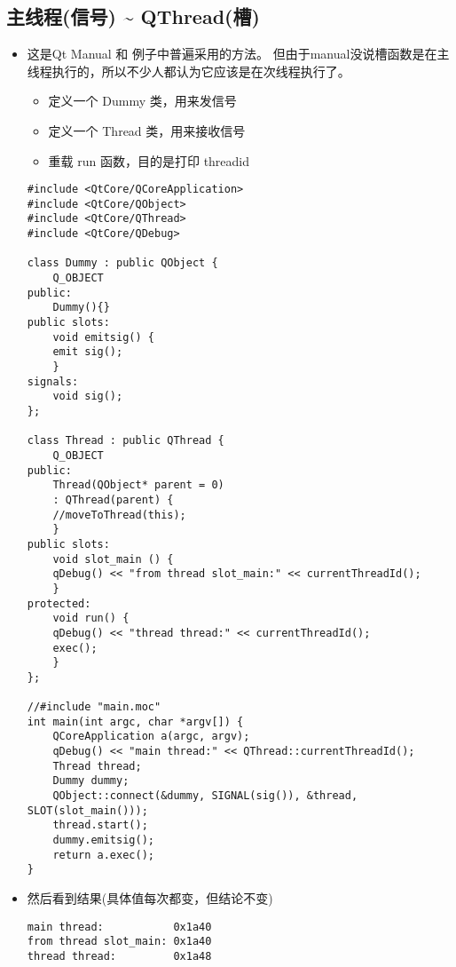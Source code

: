 \documentclass[9pt,b5paper]{article}
\begin{document}
\subsection{主线程(信号) \textasciitilde{} QThread(槽)}
\label{sec-3-3}
\begin{itemize}
\item 这是Qt Manual 和 例子中普遍采用的方法。 但由于manual没说槽函数是在主线程执行的，所以不少人都认为它应该是在次线程执行了。
\begin{itemize}
\item 定义一个 Dummy 类，用来发信号
\item 定义一个 Thread 类，用来接收信号
\item 重载 run 函数，目的是打印 threadid
\end{itemize}
\lstset{language=java,label= ,caption= ,numbers=none}
\begin{lstlisting}
#include <QtCore/QCoreApplication>   
#include <QtCore/QObject>   
#include <QtCore/QThread>   
#include <QtCore/QDebug>

class Dummy : public QObject {       
    Q_OBJECT
public:     
    Dummy(){}
public slots:
    void emitsig() {
	emit sig();       
    }
signals:
    void sig();   
};    

class Thread : public QThread {      
    Q_OBJECT
public:       
    Thread(QObject* parent = 0)
	: QThread(parent) {
	//moveToThread(this);
    }   
public slots:
    void slot_main () {           
	qDebug() << "from thread slot_main:" << currentThreadId();       
    }
protected:
    void run() {           
	qDebug() << "thread thread:" << currentThreadId();           
	exec();       
    }   
};

//#include "main.moc"
int main(int argc, char *argv[]) {       
    QCoreApplication a(argc, argv);       
    qDebug() << "main thread:" << QThread::currentThreadId();
    Thread thread;       
    Dummy dummy;      
    QObject::connect(&dummy, SIGNAL(sig()), &thread, SLOT(slot_main()));       
    thread.start();      
    dummy.emitsig();       
    return a.exec();
}
\end{lstlisting}
\item 然后看到结果(具体值每次都变，但结论不变)

\lstset{language=java,label= ,caption= ,numbers=none}
\begin{lstlisting}
main thread:           0x1a40 
from thread slot_main: 0x1a40 
thread thread:         0x1a48 


\end{lstlisting}
\end{itemize}
\end{document}
